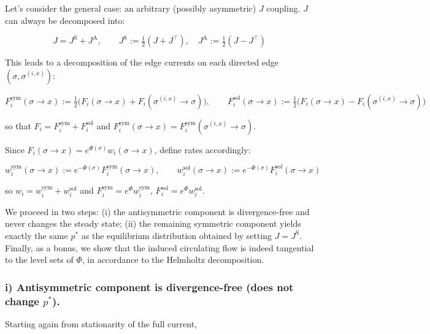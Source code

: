 \documentclass{article}
\begin{document}
Let's consider the general case: an arbitrary (possibly asymmetric) $J$ coupling. $J$ can always be decomposed into:

\begin{equation}
J = J^{\mathrm{S}} + J^{\mathrm{A}},\qquad J^{\mathrm{S}} := \tfrac12(J+J^\top), \quad J^{\mathrm{A}} := \tfrac12(J-J^\top)
\end{equation}

This leads to a decomposition of the edge currents on each directed edge $(\sigma,\sigma^{(i,x)})$:

\begin{equation}
F_i^{\mathrm{sym}}(\sigma\to x) := \tfrac12\Big(F_i(\sigma\to x)+F_i(\sigma^{(i,x)}\to\sigma)\Big),\qquad
F_i^{\mathrm{sol}}(\sigma\to x) := \tfrac12\Big(F_i(\sigma\to x)-F_i(\sigma^{(i,x)}\to\sigma)\Big)
\end{equation}

so that $F_i = F_i^{\mathrm{sym}} + F_i^{\mathrm{sol}}$ and $F_i^{\mathrm{sym}}(\sigma\to x)=F_i^{\mathrm{sym}}(\sigma^{(i,x)}\to\sigma)$.

Since $F_i(\sigma\to x) = e^{\Phi(\sigma)} w_i(\sigma\to x)$, define rates accordingly:

\begin{equation}
w_i^{\mathrm{sym}}(\sigma\to x) := e^{-\Phi(\sigma)} F_i^{\mathrm{sym}}(\sigma\to x),\qquad
w_i^{\mathrm{sol}}(\sigma\to x) := e^{-\Phi(\sigma)} F_i^{\mathrm{sol}}(\sigma\to x)
\end{equation}

so $w_i = w_i^{\mathrm{sym}} + w_i^{\mathrm{sol}}$ and $F_i^{\mathrm{sym}} = e^{\Phi}w_i^{\mathrm{sym}}$, $F_i^{\mathrm{sol}} = e^{\Phi}w_i^{\mathrm{sol}}$.

We proceed in two steps: (i) the antisymmetric component is divergence-free and never changes the steady state; (ii) the remaining symmetric component yields exactly the same $p^\ast$ as the equilibrium distribution obtained by setting $J=J^{\mathrm{S}}$. Finally, as a bonus, we show that the induced circulating flow is indeed tangential to the level sets of $\Phi$, in accordance to the Helmholtz decomposition.

\subsubsection{i) Antisymmetric component is divergence-free (does not change $p^\ast$).}

Starting again from stationarity of the full current,
\end{document}
